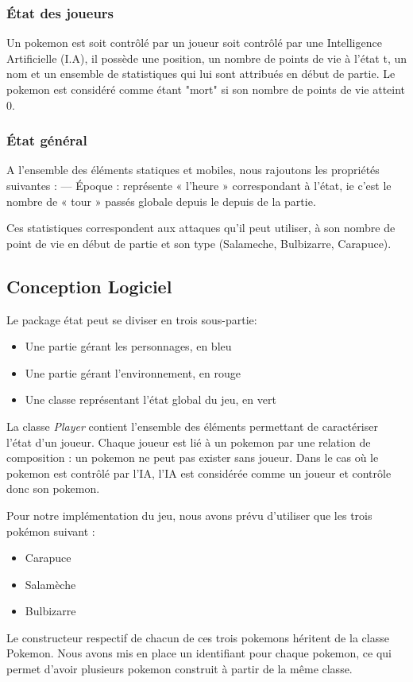 \documentclass[a4paper,12pt]{article}
\begin{document}
    \subsubsection{État des joueurs}
    Un pokemon est soit contrôlé par un joueur soit contrôlé par une Intelligence Artificielle (I.A), il possède une position, un nombre de points de vie à l'état t, un nom et un ensemble de statistiques qui lui sont attribués en début de partie. Le pokemon est considéré comme étant "mort" si son nombre de points de vie atteint 0.
    
    \subsubsection{État général}
    A l’ensemble des éléments statiques et mobiles, nous rajoutons les propriétés suivantes :
    — Époque : représente « l’heure » correspondant à l’état, ie c’est le nombre de « tour » passés
    globale depuis le depuis de la partie.

    
    Ces statistiques correspondent aux attaques qu'il peut utiliser, à son nombre de point de vie en début de partie et son type (Salameche, Bulbizarre, Carapuce).
    \subsection{Conception Logiciel}
    Le package état peut se diviser en trois sous-partie:\begin{itemize}
        \item Une partie gérant les personnages, en bleu
        \item Une partie gérant l'environnement, en rouge
        \item Une classe représentant l'état global du jeu, en vert
    \end{itemize}
    
     La classe \emph{Player} contient l'ensemble des éléments permettant de caractériser l'état d'un joueur. Chaque joueur est lié à un pokemon par une relation de composition : un pokemon ne peut pas exister sans joueur. Dans le cas où le pokemon est contrôlé par l'IA, l'IA est considérée comme un joueur et contrôle donc son pokemon.
     
    Pour notre implémentation du jeu, nous avons prévu d'utiliser que les trois pokémon suivant : \begin{itemize}
        \item Carapuce
        \item Salamèche
        \item Bulbizarre
    \end{itemize}
    Le constructeur respectif de chacun de ces trois pokemons héritent de la classe Pokemon. Nous avons mis en place un identifiant pour chaque pokemon, ce qui permet d'avoir plusieurs pokemon construit à partir de la même classe.
    
\end{document}
